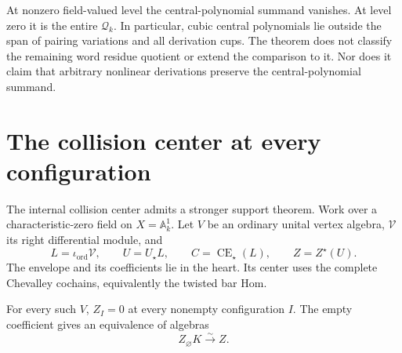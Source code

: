 At nonzero field-valued
level the central-polynomial
summand vanishes. At
level zero it is the
entire $\mathcal Q_k$.
In particular, cubic
central polynomials lie
outside the span of
pairing variations and
all derivation cups.
The theorem does not
classify the remaining
word residue quotient or
extend the comparison
to it. Nor does it claim
that arbitrary nonlinear
derivations preserve the
central-polynomial summand.

\section{The collision center at every configuration}
\label{v4-arith:centers:sec:all-configurations}

The internal collision center admits
a stronger support theorem. Work
over a characteristic-zero field on
$X=\mathbb A^1_k$. Let $V$ be an
ordinary unital vertex algebra,
$\mathscr V$ its right differential
module, and
\[
 L=\iota_{\mathrm{ord}}\mathscr V,\qquad
 U=U_\star L,\qquad
 C=\operatorname{CE}_\star(L),\qquad
 Z=Z^\star(U).
\]
The envelope and its coefficients
lie in the heart. Its center uses
the complete Chevalley cochains,
equivalently the twisted bar Hom.

\begin{theorem}\label{v4-arith:centers:thm:empty-support}
For every such $V$,
$Z_I=0$ at every nonempty
configuration $I$. The empty
coefficient gives an equivalence
of algebras
\[
 Z_\varnothing K\xrightarrow{\sim}Z.
\]
\end{theorem}

